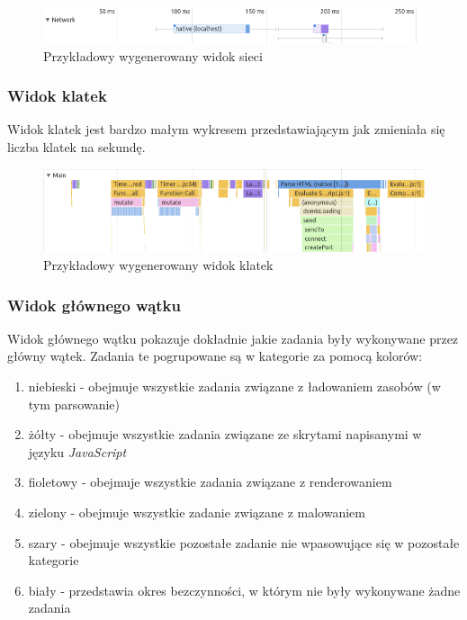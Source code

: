 \documentclass[polish, twoside, 12pt]{mwart}
\begin{document}
\begin{figure}[ht]
  \includegraphics[width=\textwidth]{chrome-devtools-performance-network-view.png}
	\caption{Przykładowy wygenerowany widok sieci}
\end{figure}

\subsubsection{Widok klatek}

Widok klatek jest bardzo małym wykresem przedstawiającym jak zmieniała się liczba klatek na sekundę.

\begin{figure}[ht]
  \includegraphics[width=\textwidth]{chrome-devtools-performance-main-view.png}
	\caption{Przykładowy wygenerowany widok klatek}
\end{figure}

\subsubsection{Widok głównego wątku}

Widok głównego wątku pokazuje dokładnie jakie zadania były wykonywane przez główny wątek. Zadania te pogrupowane są w kategorie za pomocą kolorów:

\begin{enumerate}
  \item niebieski - obejmuje wszystkie zadania związane z ładowaniem zasobów (w tym parsowanie)
  \item żółty - obejmuje wszystkie zadania związane ze skrytami napisanymi w języku \emph{JavaScript}
  \item fioletowy - obejmuje wszystkie zadania związane z renderowaniem
  \item zielony - obejmuje wszystkie zadanie związane z malowaniem
  \item szary - obejmuje wszystkie pozostałe zadanie nie wpasowujące się w pozostałe kategorie
  \item biały - przedstawia okres bezczynności, w którym nie były wykonywane żadne zadania
\end{enumerate}
\end{document}
